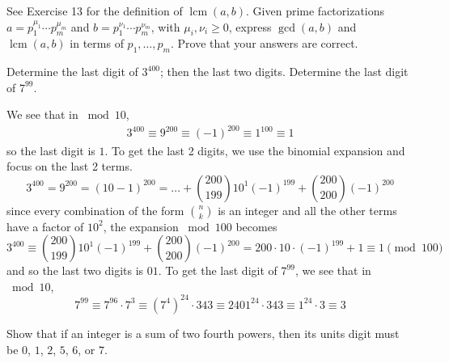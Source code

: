   \begin{exercise}[Shifrin 1.2.14]
    See Exercise 13 for the definition of $\operatorname{lcm}(a, b)$. Given prime factorizations $a = p_1^{\mu_1} \cdots p_m^{\mu_m}$ and $b = p_1^{\nu_1} \cdots p_m^{\nu_m}$, with $\mu_i, \nu_i \geq 0$, express $\gcd(a, b)$ and $\operatorname{lcm}(a, b)$ in terms of $p_1,\ldots,p_m$. Prove that your answers are correct.
  \end{exercise}
  \begin{solution}
    
  \end{solution}

  \begin{exercise}[Shifrin 1.3.8]
    Determine the last digit of $3^{400}$; then the last two digits. Determine the last digit of $7^{99}$.
  \end{exercise}
  \begin{solution}
    We see that in $\bmod{10}$, 
    \begin{align}
      3^{400} \equiv 9^{200} \equiv (-1)^{200} \equiv 1^{100} \equiv 1
    \end{align} 
    so the last digit is $1$. To get the last 2 digits, we use the binomial expansion and focus on the last 2 terms. 
    \begin{equation}
      3^{400} = 9^{200} = (10 - 1)^{200} = \ldots + \binom{200}{199} 10^1 (-1)^{199} + \binom{200}{200} (-1)^{200} 
    \end{equation}
    since every combination of the form $\binom{n}{k}$ is an integer and all the other terms have a factor of $10^2$, the expansion $\bmod{100}$ becomes 
    \begin{equation}
      3^{400} \equiv \binom{200}{199} 10^1 (-1)^{199} + \binom{200}{200} (-1)^{200} = 200 \cdot 10 \cdot (-1)^{199} + 1 \equiv 1 \pmod{100}
    \end{equation}
    and so the last two digits is $01$. To get the last digit of $7^{99}$, we see that in $\bmod{10}$, 
    \begin{equation}
      7^{99} \equiv 7^{96} \cdot 7^3 \equiv (7^4)^{24} \cdot 343 \equiv 2401^{24} \cdot 343 \equiv 1^{24} \cdot 3 \equiv 3
    \end{equation}
  \end{solution}

  \begin{exercise}[Shifrin 1.3.9]
    Show that if an integer is a sum of two fourth powers, then its units digit must be $0$, $1$, $2$, $5$, $6$, or $7$.
  \end{exercise}
  \begin{solution}
    
  \end{solution}

